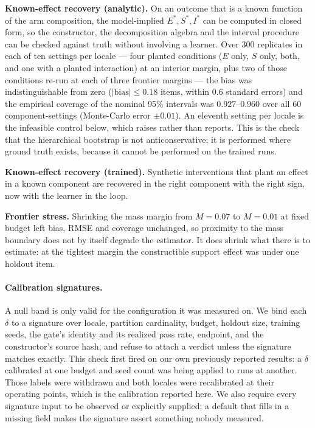 \documentclass[10pt,twocolumn]{article}
\begin{document}
\textbf{Known-effect recovery (analytic).} On an outcome that is a known function of the arm
composition, the model-implied $E^\ast,S^\ast,I^\ast$ can be computed in closed form, so the
constructor, the decomposition algebra and the interval procedure can be checked against truth
without involving a learner. Over 300 replicates in each of ten settings per locale --- four planted
conditions ($E$ only, $S$ only, both, and one with a planted interaction) at an interior margin,
plus two of those conditions re-run at each of three frontier margins --- the bias was
indistinguishable from zero ($|\mathrm{bias}|\le 0.18$ items, within $0.6$ standard errors) and
the empirical coverage of the nominal 95\% intervals was $0.927$--$0.960$ over all 60
component-settings (Monte-Carlo error $\pm0.01$). An eleventh setting per locale is the
infeasible control below, which raises rather than reports. This is the check that the hierarchical bootstrap is not anticonservative; it is
performed where ground truth exists, because it cannot be performed on the trained runs.

\textbf{Known-effect recovery (trained).} Synthetic interventions that plant an effect in a
known component are recovered in the right component with the right sign, now with the learner
in the loop.

\textbf{Frontier stress.} Shrinking the mass margin from $M=0.07$ to $M=0.01$ at fixed budget
left bias, RMSE and coverage unchanged, so proximity to the mass boundary does not by itself
degrade the estimator. It does shrink what there is to estimate: at the tightest margin the
constructible support effect was under one holdout item.

\paragraph{Calibration signatures.}
A null band is only valid for the configuration it was measured on. We bind each $\delta$ to a
signature over locale, partition cardinality, budget, holdout size, training seeds, the gate's
identity and its realized pass rate, endpoint, and the constructor's source hash, and refuse to attach a verdict unless the signature matches
exactly. This check first fired on our own previously reported results: a $\delta$ calibrated at
one budget and seed count was being applied to runs at another. Those labels were withdrawn and
both locales were recalibrated at their operating points, which is the calibration reported
here. We also require every signature input to be observed or explicitly supplied; a default
that fills in a missing field makes the signature assert something nobody measured.
\end{document}

